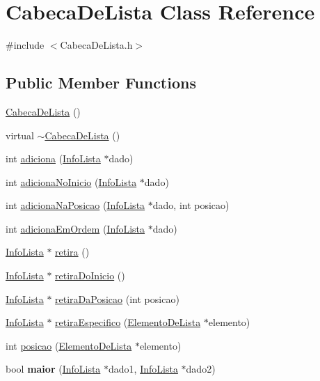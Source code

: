 \hypertarget{classCabecaDeLista}{
\section{CabecaDeLista Class Reference}
\label{classCabecaDeLista}
}


{\ttfamily \#include $<$CabecaDeLista.h$>$}

\subsection*{Public Member Functions}
\begin{DoxyCompactItemize}
\item 
\hyperlink{classCabecaDeLista_a4f98b6e8ad0e10a0e72815f989bbf69d}{CabecaDeLista} ()
\item 
virtual \hyperlink{classCabecaDeLista_a3b9b2d3a2059ca5227a36b8b34644b85}{$\sim$CabecaDeLista} ()
\item 
int \hyperlink{classCabecaDeLista_ab6dfa57b422ae81cc2d5f0fe3394bee7}{adiciona} (\hyperlink{classInfoLista}{InfoLista} $\ast$dado)
\item 
int \hyperlink{classCabecaDeLista_a2eab1cd95446b6d32d88983983d596ac}{adicionaNoInicio} (\hyperlink{classInfoLista}{InfoLista} $\ast$dado)
\item 
int \hyperlink{classCabecaDeLista_ab86a9b79ff968e1fc1a09ae3923140e4}{adicionaNaPosicao} (\hyperlink{classInfoLista}{InfoLista} $\ast$dado, int posicao)
\item 
int \hyperlink{classCabecaDeLista_a2c291397e9c6bb65a2b8ede865180781}{adicionaEmOrdem} (\hyperlink{classInfoLista}{InfoLista} $\ast$dado)
\item 
\hyperlink{classInfoLista}{InfoLista} $\ast$ \hyperlink{classCabecaDeLista_a5277d2478a360e506b5115c024b8b7be}{retira} ()
\item 
\hyperlink{classInfoLista}{InfoLista} $\ast$ \hyperlink{classCabecaDeLista_abbbf9e0e72a5b78cce0eb05a5ed0904a}{retiraDoInicio} ()
\item 
\hyperlink{classInfoLista}{InfoLista} $\ast$ \hyperlink{classCabecaDeLista_a942d3c754f89d38000b2e4192a23c690}{retiraDaPosicao} (int posicao)
\item 
\hyperlink{classInfoLista}{InfoLista} $\ast$ \hyperlink{classCabecaDeLista_aa6f8b8c3c25f6ed94eee92a4165780bf}{retiraEspecifico} (\hyperlink{classElementoDeLista}{ElementoDeLista} $\ast$elemento)
\item 
int \hyperlink{classCabecaDeLista_a19f01b433d6ffa11a02a7c87d52c3d3e}{posicao} (\hyperlink{classElementoDeLista}{ElementoDeLista} $\ast$elemento)
\item 
\hypertarget{classCabecaDeLista_ace88d8a3bcc4c6070215a919015fa8de}{
bool {\bfseries maior} (\hyperlink{classInfoLista}{InfoLista} $\ast$dado1, \hyperlink{classInfoLista}{InfoLista} $\ast$dado2)}
\label{classCabecaDeLista_ace88d8a3bcc4c6070215a919015fa8de}


\end{DoxyCompactItemize}
